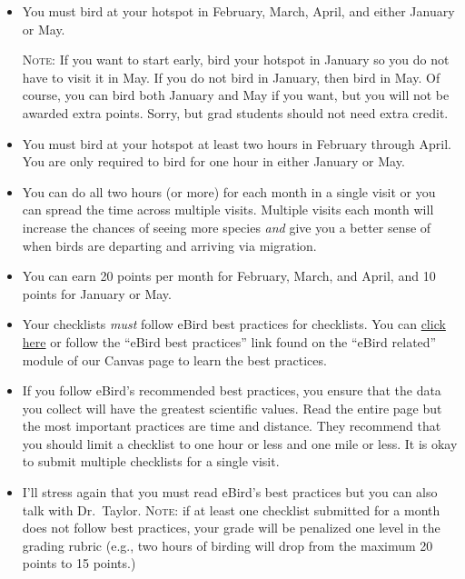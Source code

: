 \documentclass[12pt]{article}
\begin{document}
\begin{itemize}
\item You must bird at your hotspot in February, March, April, and either January or May. 

\textsc{Note:} If you want to start early, bird your hotspot in January so you do not have to visit it in May. If you do not bird in January, then bird in May. Of course, you can bird both January and May if you want, but you will not be awarded extra points. Sorry, but grad students should not need extra credit.

\item You must bird at your hotspot at least two hours in February through April. You are only required to bird for one hour in either January or May.

\item You can do all two hours (or more) for each month in a single visit or you can spread the time across multiple visits. Multiple visits each month will increase the chances of seeing more species \emph{and} give you a better sense of when birds are departing and arriving via migration.

\item You can earn 20 points per month for February, March, and April, and 10 points for January or May.

\item Your checklists \textit{must} follow eBird best practices for checklists. You can \href{https://support.ebird.org/en/support/solutions/articles/48000795623-ebird-rules-and-best-practices}{click here} or follow the “eBird best practices” link found on the “eBird related” module of our Canvas page to learn the best practices.

\item If you follow eBird's recommended best practices, you ensure that the data you collect will have the greatest scientific values. Read the entire page but the most important practices are time and distance. They recommend that you should limit a checklist to one hour or less and one mile or less. It is okay to submit multiple checklists for a single visit. 

\item I'll stress again that you must read eBird's best practices but you can also talk with Dr.~Taylor. \textsc{Note:} if at least one checklist submitted for a month  does not follow best practices, your grade will be penalized one level in the grading rubric (e.g., two hours of birding will drop from the maximum 20 points to 15 points.)


\end{itemize}
\end{document}
